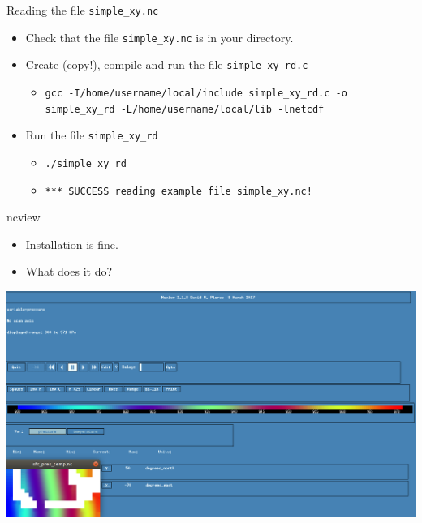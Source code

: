 \documentclass[compress,11pt,xcolor=svgnames,aspectratio=169]{beamer}
\begin{document}
\begin{frame}[fragile]{Reading the file \texttt{simple\_xy.nc}}

\begin{itemize}
\setlength\itemsep{0.6cm}

  \item Check that the file \verb|simple_xy.nc| is in your directory.

  \item Create (copy!), compile and run the file \verb|simple_xy_rd.c|\\[0.4cm]

        \begin{itemize}
          \item {\tiny  \verb|gcc -I/home/username/local/include simple_xy_rd.c -o simple_xy_rd -L/home/username/local/lib -lnetcdf| }\\[0.4cm]
        \end{itemize}

  \item Run the file \verb|simple_xy_rd|

        \begin{itemize}

          \item {\tiny  \verb|./simple_xy_rd|}

          \item {\tiny  \verb|*** SUCCESS reading example file simple_xy.nc!|}

        \end{itemize}

\end{itemize}

\end{frame}

\begin{frame}[fragile]{ncview}

\begin{itemize}

  \item Installation is fine.
  \item What does it do?

\end{itemize}

\begin{center}
\includegraphics[scale=0.3]{fig/ncview}
\end{center}

\end{frame}

\acknowledgement
\end{document}
